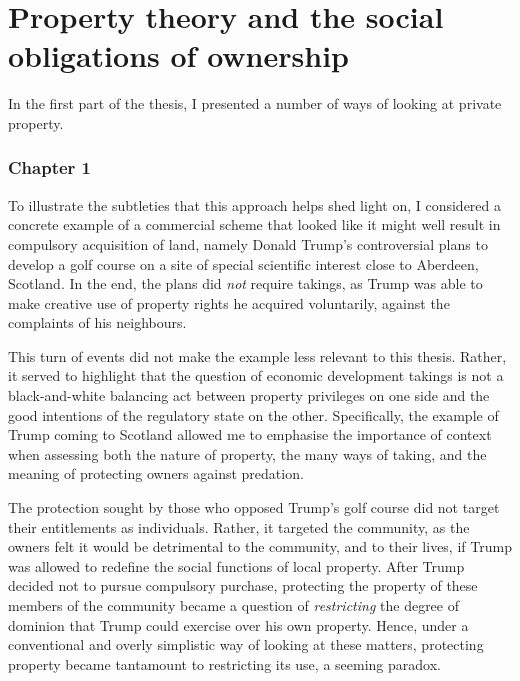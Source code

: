 

\section{Property theory and the social obligations of ownership}

In the first part of the thesis, I presented a number of ways of looking at private property. 

\subsubsection{Chapter 1}

To illustrate the subtleties that this approach helps shed light on, I considered a concrete example of a commercial scheme that looked like it might well result in compulsory acquisition of land, namely Donald Trump's controversial plans to develop a golf course on a site of special scientific interest close to Aberdeen, Scotland. In the end, the plans did {\it not} require takings, as Trump was able to make creative use of property rights he acquired voluntarily, against the complaints of his neighbours.

This turn of events did not make the example less relevant to this thesis. Rather, it served to highlight that the question of economic development takings is not a black-and-white balancing act between property privileges on one side and the good intentions of the regulatory state on the other. Specifically, the example of Trump coming to Scotland allowed me to emphasise the importance of context when assessing both the nature of property, the many ways of taking, and the meaning of protecting owners against predation.

The protection sought by those who opposed Trump's golf course did not target their entitlements as individuals. Rather, it targeted the community, as the owners felt it would be detrimental to the community, and to their lives, if Trump was allowed to redefine the social functions of local property. After Trump decided not to pursue compulsory purchase, protecting the property of these members of the community became a question of {\it restricting} the degree of dominion that Trump could exercise over his own property. Hence, under a conventional and overly simplistic way of looking at these matters, protecting property became tantamount to restricting its use, a seeming paradox.

